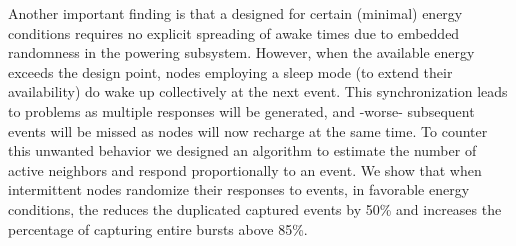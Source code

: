 Another important finding is that a \cis designed for certain (minimal) energy conditions requires no explicit spreading of awake times due to embedded randomness in the powering subsystem. However, when the available energy exceeds the design point, nodes employing a sleep mode (to extend their availability) do wake up collectively at the next event. This synchronization leads to problems as multiple responses will be generated, and -worse- subsequent events will be missed as nodes will now recharge at the same time.
To counter this unwanted behavior we designed an algorithm to estimate the number of active neighbors and respond proportionally to an event. 
We show that when intermittent nodes randomize their responses to events, in favorable energy conditions, the \cis reduces the duplicated captured events by 50\% and increases the percentage of capturing entire bursts above 85\%. 
